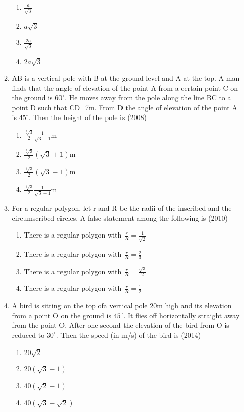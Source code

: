 \documentclass[12pt]{article}
\begin{document}
\begin{enumerate}
\begin{enumerate}
\begin{enumerate}
\item $\frac{a}{\sqrt{3}}$
\item $a\sqrt{3}$
\item $\frac{2a}{\sqrt{3}}$
\item $2a\sqrt{3}$
\end{enumerate}
\item AB is a vertical pole with B at the ground level and A at the top. A man finds that the angle of elevation of the point A from a certain point C on the ground is $60^\circ$. He moves away from the pole along the line BC to a point D such that CD=7m. From D the angle of elevation of the point A is $45^\circ$. Then the height of the pole is (2008)
\begin{enumerate}
\item $\frac{\sqrt[7]{3}}{2}\frac{1}{\sqrt{3}-1}$m
\item $\frac{\sqrt[7]{3}}{2}(\sqrt{3}+1)$m
\item $\frac{\sqrt[7]{3}}{2}(\sqrt{3}-1)$m
\item $\frac{\sqrt[7]{3}}{2}\frac{1}{\sqrt{3}+1}$m
\end{enumerate}
\item For a regular polygon, let r and R be the radii of the inscribed and the circumscribed circles. A false statement among the following is (2010)
\begin{enumerate}
\item There is a regular polygon with $\frac{r}{R}=\frac{1}{\sqrt{2}}$
\item There is a regular polygon with $\frac{r}{R}=\frac{2}{3}$
\item There is a regular polygon with $\frac{r}{R}=\frac{\sqrt{3}}{2}$
\item There is a regular polygon with $\frac{r}{R}=\frac{1}{2}$
\end{enumerate}
\item A bird is sitting on the top ofa vertical pole 20m high and its elevation from a point O on the ground is $45^\circ$. It flies off horizontally straight away from the point O. After one second the elevation of the bird from O is reduced to $30^\circ$. Then the speed (in m/s) of the bird is (2014)
\begin{enumerate}
\item $20\sqrt{2}$
\item $20(\sqrt{3}-1)$
\item $40(\sqrt{2}-1)$
\item $40(\sqrt{3}-\sqrt{2})$

\end{enumerate}
\end{enumerate}
\end{enumerate}
\end{document}
